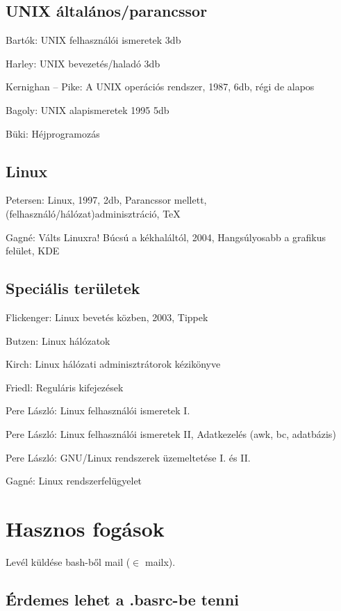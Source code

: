 \documentclass[a4paper]{article}
\newcommand{\code}{\texttt}
\begin{document}
\subsection{UNIX általános/parancssor}

Bartók: UNIX felhasználói ismeretek 3db

Harley: UNIX bevezetés/haladó 3db

Kernighan -- Pike: A UNIX operációs rendszer, 1987, 6db, régi de alapos

Bagoly: UNIX alapismeretek 1995 5db

Büki: Héjprogramozás

\subsection{Linux}

Petersen: Linux, 1997, 2db, Parancssor mellett, (felhasználó/hálózat)adminisztráció, TeX

Gagné: Válts Linuxra! Búcsú a kékhaláltól, 2004, Hangsúlyosabb a grafikus felület, KDE

\subsection{Speciális területek}

Flickenger: Linux bevetés közben, 2003, Tippek

Butzen: Linux hálózatok

Kirch: Linux hálózati adminisztrátorok kézikönyve

Friedl: Reguláris kifejezések

Pere László: Linux felhasználói ismeretek I.

Pere László: Linux felhasználói ismeretek II, Adatkezelés (awk, bc, adatbázis)

Pere László: GNU/Linux rendszerek üzemeltetése I. és II.

Gagné: Linux rendszerfelügyelet

\section{Hasznos fogások}

Levél küldése bash-ből mail ($\in$ mailx).


\subsection{Érdemes lehet a .basrc-be tenni}
\end{document}
